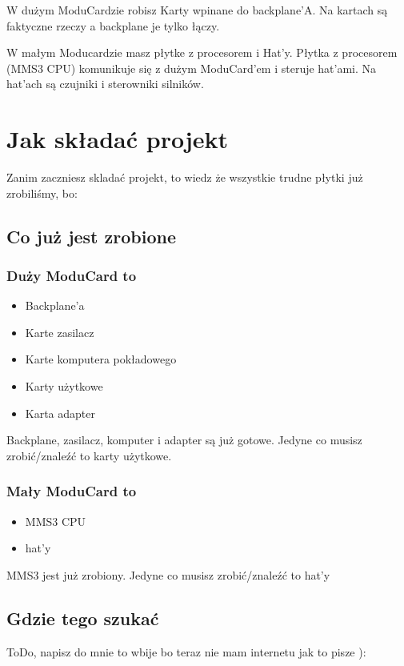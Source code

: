 \documentclass[b5paper, 10pt, twoside]{book}
\begin{document}
W dużym ModuCardzie robisz Karty wpinane do backplane'A. Na kartach są faktyczne rzeczy a backplane je tylko łączy. 

W małym Moducardzie masz płytke z procesorem i Hat'y. Płytka z procesorem (MMS3 CPU) komunikuje się z dużym ModuCard'em i steruje hat'ami. Na hat'ach są czujniki i sterowniki silników.

\section{Jak składać projekt}

Zanim zaczniesz skladać projekt, to wiedz że wszystkie trudne płytki już zrobiliśmy, bo:

\subsection{Co już jest zrobione}
\subsubsection{Duży ModuCard to}

\begin{itemize}
  \item Backplane'a
  \item Karte zasilacz
  \item Karte komputera pokładowego
  \item Karty użytkowe
  \item Karta adapter
\end{itemize}

Backplane, zasilacz, komputer i adapter są już gotowe. Jedyne co musisz zrobić/znaleźć to karty użytkowe.

\subsubsection{Mały ModuCard to}

\begin{itemize}
  \item MMS3 CPU
  \item hat'y
\end{itemize}

MMS3 jest już zrobiony. Jedyne co musisz zrobić/znaleźć to hat'y


\subsection{Gdzie tego szukać}
ToDo, napisz do mnie to wbije bo teraz nie mam internetu jak to pisze ):
\end{document}
